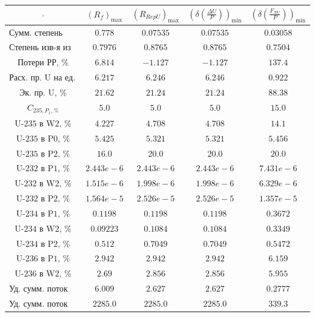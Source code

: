 \begin{table}
    \begin{tabular}{ccccc}
        $\cdot$ & $(R_f)_\text{max}$ & $(R_{RepU})_\text{max}$ & $(\delta(\frac{\Delta U}{P}))_\text{min}$ & $(\delta(\frac{F_{NU}}{P}))_\text{min}$\\ \hline
        $\text{Сумм. степень изв-я}$ & $0.778$ & $0.07535$ & $0.07535$ & $0.03058$\\ \hline
        $\text{Степень изв-я из рег-та}$ & $0.7976$ & $0.8765$ & $0.8765$ & $0.7504$\\ \hline
        $\text{Потери РР, \%}$ & $6.814$ & $-1.127$ & $-1.127$ & $137.4$\\ \hline
        $\text{Расх. пр. U на ед. прод.}$ & $6.217$ & $6.246$ & $6.246$ & $0.922$\\ \hline
        $\text{Эк. пр. U, \%}$ & $21.62$ & $21.24$ & $21.24$ & $88.38$\\ \hline
        $C_{235,P_1, \%}$ & $5.0$ & $5.0$ & $5.0$ & $15.0$\\ \hline
        $\text{U-235 в W2, \%}$ & $4.227$ & $4.708$ & $4.708$ & $14.1$\\ \hline
        $\text{U-235 в P0, \%}$ & $5.425$ & $5.321$ & $5.321$ & $5.456$\\ \hline
        $\text{U-235 в P2, \%}$ & $16.0$ & $20.0$ & $20.0$ & $20.0$\\ \hline
        $\text{U-232 в P1, \%}$ & $2.443e-6$ & $2.443e-6$ & $2.443e-6$ & $7.431e-6$\\ \hline
        $\text{U-232 в W2, \%}$ & $1.515e-6$ & $1.998e-6$ & $1.998e-6$ & $6.329e-6$\\ \hline
        $\text{U-232 в P2, \%}$ & $1.564e-5$ & $2.526e-5$ & $2.526e-5$ & $1.357e-5$\\ \hline
        $\text{U-234 в P1, \%}$ & $0.1198$ & $0.1198$ & $0.1198$ & $0.3672$\\ \hline
        $\text{U-234 в W2, \%}$ & $0.09223$ & $0.1084$ & $0.1084$ & $0.3349$\\ \hline
        $\text{U-234 в P2, \%}$ & $0.512$ & $0.7049$ & $0.7049$ & $0.5472$\\ \hline
        $\text{U-236 в P1, \%}$ & $2.942$ & $2.942$ & $2.942$ & $6.159$\\ \hline
        $\text{U-236 в W2, \%}$ & $2.69$ & $2.856$ & $2.856$ & $5.955$\\ \hline
        $\text{Уд. сумм. поток к-а 2}$ & $6.009$ & $2.627$ & $2.627$ & $0.2777$\\ \hline
        $\text{Уд. сумм. поток доп. к-а}$ & $2285.0$ & $2285.0$ & $2285.0$ & $339.3$\\ \hline

\end{tabular}
\end{table}
